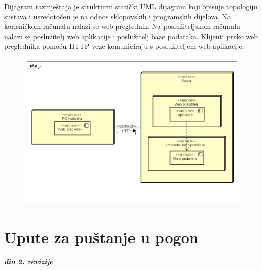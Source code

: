 \noindent Dijagram razmještaja je strukturni statički UML dijagram koji opisuje topologiju sustava i usredotočen je na odnos sklopovskih i programskih dijelova. Na korisničkom računalu nalazi se web preglednik. Na poslužiteljskom računalu nalazi se poslužitelj web aplikacije i poslužitelj baze podataka. Klijenti preko web preglednika pomoću HTTP veze komuniciraju s poslužiteljem web aplikacije.

\begin{figure}[H]
	\includegraphics[scale=0.5]{slike/dijagram_razmjestaja.PNG} %
	\centering
\end{figure}

\eject 

\section{Upute za puštanje u pogon}

\textbf{\textit{dio 2. revizije}}\\

